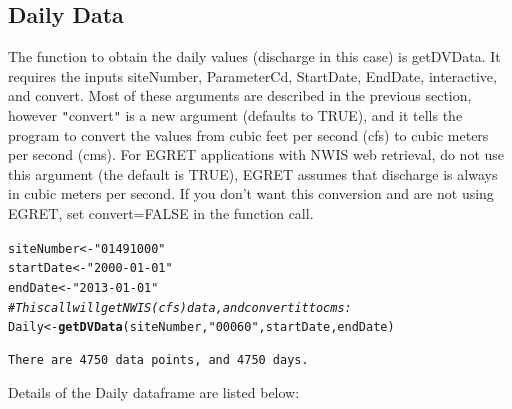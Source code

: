 \documentclass[a4paper,11pt]{article}\usepackage[]{graphicx}\usepackage[]{color}
\makeatletter
\newcommand{\hlstr}[1]{\textcolor[rgb]{0.192,0.494,0.8}{#1}}%
\newcommand{\hlcom}[1]{\textcolor[rgb]{0.678,0.584,0.686}{\textit{#1}}}%
\newcommand{\hlstd}[1]{\textcolor[rgb]{0.345,0.345,0.345}{#1}}%
\newcommand{\hlkwb}[1]{\textcolor[rgb]{0.69,0.353,0.396}{#1}}%
\newcommand{\hlkwd}[1]{\textcolor[rgb]{0.737,0.353,0.396}{\textbf{#1}}}%
\newenvironment{kframe}{%
 \def\at@end@of@kframe{}%
 \ifinner\ifhmode%
  \def\at@end@of@kframe{\end{minipage}}%
  \begin{minipage}{\columnwidth}%
 \fi\fi%
 \def\FrameCommand##1{\hskip\@totalleftmargin \hskip-\fboxsep
 \colorbox{shadecolor}{##1}\hskip-\fboxsep
     \hskip-\linewidth \hskip-\@totalleftmargin \hskip\columnwidth}%
 \MakeFramed {\advance\hsize-\width
   \@totalleftmargin\z@ \linewidth\hsize
   \@setminipage}}%
 {\par\unskip\endMakeFramed%
 \at@end@of@kframe}
\newenvironment{knitrout}{}{} %
\makeatother
\begin{document}
\FloatBarrier

\subsection{Daily Data}
The function to obtain the daily values (discharge in this case) is getDVData.  It requires the inputs siteNumber, ParameterCd, StartDate, EndDate, interactive, and convert. Most of these arguments are described in the previous section, however \texttt{"}convert\texttt{"} is a new argument (defaults to TRUE), and it tells the program to convert the values from cubic feet per second (cfs) to cubic meters per second (cms). For EGRET applications with NWIS web retrieval, do not use this argument (the default is TRUE), EGRET assumes that discharge is always in cubic meters per second. If you don't want this conversion and are not using EGRET, set convert=FALSE in the function call. 

\begin{knitrout}
\color{fgcolor}\begin{kframe}
\begin{alltt}
\hlstd{siteNumber} \hlkwb{<-} \hlstr{"01491000"}
\hlstd{startDate} \hlkwb{<-} \hlstr{"2000-01-01"}
\hlstd{endDate} \hlkwb{<-} \hlstr{"2013-01-01"}
\hlcom{# This call will get NWIS (cfs) data , and convert it to cms:}
\hlstd{Daily} \hlkwb{<-} \hlkwd{getDVData}\hlstd{(siteNumber,} \hlstr{"00060"}\hlstd{, startDate, endDate)}
\end{alltt}
\begin{verbatim}
There are 4750 data points, and 4750 days.
\end{verbatim}
\end{kframe}
\end{knitrout}


Details of the Daily dataframe are listed below:
\end{document}

